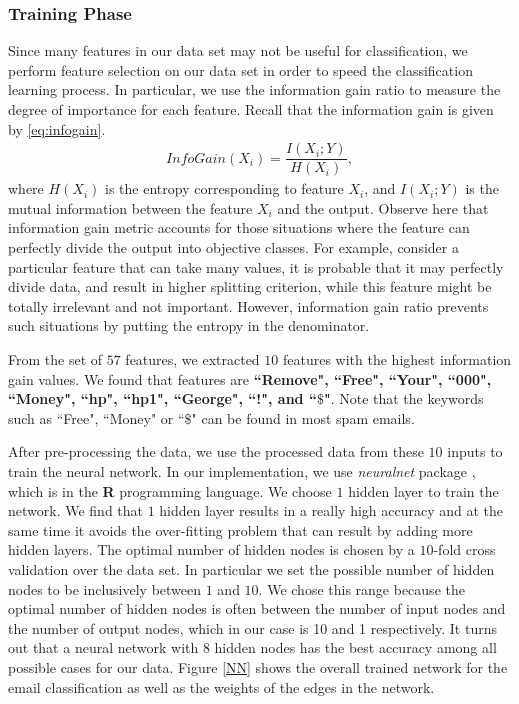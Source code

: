 \documentclass[11pt,oneside,reqno]{amsart}
\theoremstyle{definition}
\theoremstyle{definition}
\theoremstyle{remark}
\numberwithin{equation}{section}
\numberwithin{equation}{section}
\begin{document}
\subsubsection{Training Phase}
Since many features in our data set may not be useful for classification, we perform feature selection on our data set in order to speed the classification learning process. In particular, we use the information gain ratio to measure the degree of importance for each feature. Recall that the information gain is given by \ref{eq:infogain}.
\begin{align} \label{eq:infogain}
InfoGain(X_i) = \dfrac{I(X_i;Y)}{H(X_i)},
\end{align}
where $H(X_i)$ is the entropy corresponding to feature $X_i$, and $I(X_i;Y)$ is the mutual information between the feature $X_i$ and the output. Observe here that information gain metric accounts for those situations where the feature can perfectly divide the output into objective classes. For example, consider a particular feature that can take many values, it is probable that it may perfectly divide data, and result in higher splitting criterion, while this feature might be totally irrelevant and not important. However, information gain ratio prevents such situations by putting the entropy in the denominator.

From the set of $57$ features, we extracted $10$ features with the highest information gain values. We found that features are \textbf{``Remove", ``Free", ``Your", ``000", ``Money", ``hp", ``hp1", ``George", ``!", and ``$\$$"}. Note that the keywords such as ``Free", ``Money" or ``$\$$" can be found in most spam emails.

After pre-processing the data, we use the processed data from these $10$ inputs to train the neural network. In our implementation, we use \textit{neuralnet} package \cite{neuralnet}, which is in the \textbf{R} programming language. We choose $1$ hidden layer to train the network. We find that $1$ hidden layer results in a really high accuracy and at the same time it avoids the over-fitting problem that can result by adding more hidden layers. The optimal number of hidden nodes is chosen by a $10$-fold cross validation over the data set. In particular we set the possible number of hidden nodes to be inclusively between $1$ and $10$. We chose this range because the optimal number of hidden nodes is often between the number of input nodes and the number of output nodes, which in our case is 10 and 1 respectively. It turns out that a neural network with $8$ hidden nodes has the best accuracy among all possible cases for our data. Figure \ref{NN} shows the overall trained network for the email classification as well as the weights of the edges in the network.
\end{document}
